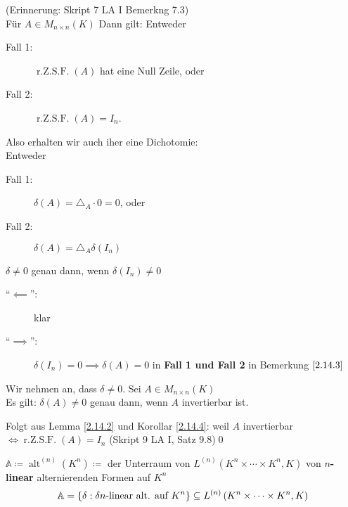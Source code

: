\begin{subnote}
	(Erinnerung: Skript 7 LA I Bemerkng 7.3)\\
	Für $ A \in M_{n \times n} (K) $ 
	Dann gilt: Entweder
	\begin{description}
		\item[Fall 1:] $ \operatorname{r.Z.S.F.} (A) $ hat eine Null Zeile, oder
		\item[Fall 2:] $ \operatorname{r.Z.S.F.} (A) = I_n $.
	\end{description}
	Also erhalten wir auch iher eine Dichotomie:\\
	Entweder
	\begin{description}
		\item[Fall 1:] $ \delta(A) = \triangle_A \cdot 0 = 0 $, oder
		\item[Fall 2:] $ \delta(A) = \triangle_A \delta(I_n) $
	\end{description}
\end{subnote}

\begin{subcorollary}
	$ \delta \neq 0 $ genau dann, wenn $ \delta(I_n) \neq 0 $
\end{subcorollary}
\begin{subproof*}
	\begin{description}
		\item[``$ \impliedby  $'':] klar
		\item[``$ \implies  $'':] $ \delta(I_n) = 0 \implies \delta(A) = 0 $ in \textbf{Fall 1 und Fall 2} in Bemerkung $ \ref{2.14.3} $
	\end{description}
\end{subproof*}

\begin{subcorollary}
	Wir nehmen an, dass $ \delta \neq 0 $.
	Sei $ A \in M_{n \times n} (K) $\\
	Es gilt: $ \delta(A) \neq  0 $ genau dann, wenn $ A $ invertierbar ist.
\end{subcorollary}
\begin{subproof*}
	Folgt aus Lemma \ref{2.14.2} und Korollar \ref{2.14.4}: weil $ A $ invertierbar $ \iff \operatorname{r.Z.S.F.} (A) = I_n $ (Skript 9 LA I, Satz 9.8)\qed
\end{subproof*}

\begin{subdefinition}
	$ \mathbb{A} \coloneqq \operatorname{alt}^{(n)} \left( K^n \right) \coloneqq   $ der Unterraum von $ L^{(n)} \left( K^n \times \dotsb \times K^n, K \right)  $ von \textbf{$ n $-linear} alternierenden Formen auf $ K^n $
	\[
		\mathbb{A} = \left\{ \delta : \delta n \text{-linear alt. auf $ K^n $}  \right\} \subseteq L^{(n)} \left( K^n \times \dotsb \times K^n, K \right) 
	\]
\end{subdefinition}

